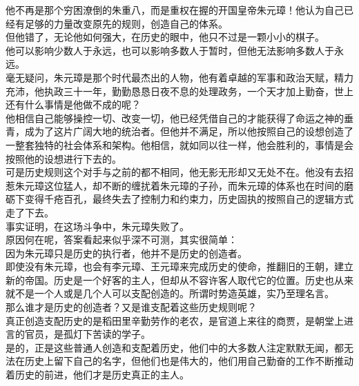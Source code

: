 \begin{multicols}{\theparacolNo}
他不再是那个穷困潦倒的朱重八，而是重权在握的开国皇帝朱元璋！他认为自己已经有足够的力量改变原先的规则，创造自己的体系。\\

但他错了，无论他如何强大，在历史的眼中，他只不过是一颗小小的棋子。\\

他可以影响少数人于永远，也可以影响多数人于暂时，但他无法影响多数人于永远。\\

毫无疑问，朱元璋是那个时代最杰出的人物，他有着卓越的军事和政治天赋，精力充沛，他执政三十一年，勤勤恳恳日夜不息的处理政务，一个天才加上勤奋，世上还有什么事情是他做不成的呢？\\

他相信自己能够操控一切、改变一切，他已经凭借自己的才能获得了命运之神的垂青，成为了这片广阔大地的统治者。但他并不满足，所以他按照自己的设想创造了一整套独特的社会体系和架构。他相信，就如同以往一样，他会胜利的，事情是会按照他的设想进行下去的。\\

可是历史规则这个对手与之前的都不相同，他无影无形却又无处不在。他没有去招惹朱元璋这位猛人，却不断的缠扰着朱元璋的子孙，而朱元璋的体系也在时间的磨砺下变得千疮百孔，最终失去了控制力和约束力，历史固执的按照自己的逻辑方式走了下去。\\

事实证明，在这场斗争中，朱元璋失败了。\\

原因何在呢，答案看起来似乎深不可测，其实很简单：\\

因为朱元璋只是历史的执行者，他并不是历史的创造者。\\

即使没有朱元璋，也会有李元璋、王元璋来完成历史的使命，推翻旧的王朝，建立新的帝国。历史是一个好客的主人，但却从不容许客人取代它的位置。历史也从来就不是一个人或是几个人可以支配创造的。所谓时势造英雄，实乃至理名言。\\

那么谁才是历史的创造者？又是谁支配着这些历史规则呢？\\

真正创造支配历史的是稻田里辛勤劳作的老农，是官道上来往的商贾，是朝堂上进言的官员，是孤灯下苦读的学子。\\

是的，正是这些普通人创造和支配着历史，他们中的大多数人注定默默无闻，都无法在历史上留下自己的名字，但他们也是伟大的，他们用自己勤奋的工作不断推动着历史的前进，他们才是历史真正的主人。\\


\end{multicols}
